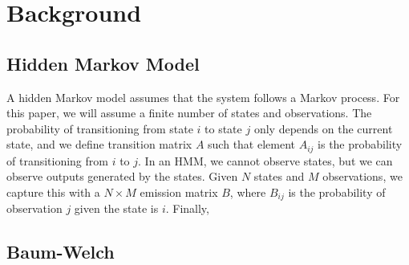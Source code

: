 \section{Background}

\subsection{Hidden Markov Model}
A hidden Markov model assumes that the system follows a Markov process. For this paper, we will assume a finite number of states and observations. The probability of transitioning from state $i$ to state $j$ only depends on the current state, and we define transition matrix $A$ such that element $A_{ij}$ is the probability  of transitioning from $i$ to $j$. In an HMM, we cannot observe states, but we can observe outputs generated by the states. Given $N$ states and $M$ observations, we capture this with a $N \times M$ emission matrix $B$, where $B_{ij}$ is the probability of observation $j$ given the state is $i$. Finally, 

\subsection{Baum-Welch}

